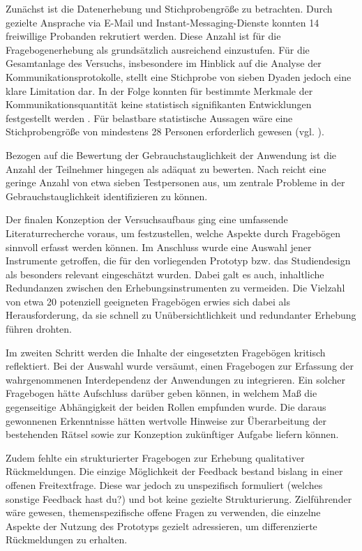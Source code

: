 Zunächst ist die Datenerhebung und Stichprobengröße zu betrachten. Durch gezielte Ansprache via E-Mail und Instant-Messaging-Dienste konnten 14 freiwillige Probanden rekrutiert werden. Diese Anzahl ist für die Fragebogenerhebung als grundsätzlich ausreichend einzustufen. Für die Gesamtanlage des Versuchs, insbesondere im Hinblick auf die Analyse der Kommunikationsprotokolle, stellt eine Stichprobe von sieben Dyaden jedoch eine klare Limitation dar. In der Folge konnten für bestimmte Merkmale der Kommunikationsquantität keine statistisch signifikanten Entwicklungen festgestellt werden . Für belastbare statistische Aussagen wäre eine Stichprobengröße von mindestens 28 Personen erforderlich gewesen (vgl. \citealp[S. 158]{cohen_power_1992}). 

Bezogen auf die Bewertung der Gebrauchstauglichkeit der Anwendung ist die Anzahl der Teilnehmer hingegen als adäquat zu bewerten. Nach  \citet[S. 3088]{turner_determining_2006} reicht eine geringe Anzahl von etwa sieben Testpersonen aus, um zentrale Probleme in der Gebrauchstauglichkeit identifizieren zu können.

Der finalen Konzeption der Versuchsaufbaus ging eine umfassende Literaturrecherche voraus, um festzustellen, welche Aspekte durch Fragebögen sinnvoll erfasst werden können. Im Anschluss wurde eine Auswahl jener Instrumente getroffen, die für den vorliegenden Prototyp bzw. das Studiendesign als besonders relevant eingeschätzt wurden. Dabei galt es auch, inhaltliche Redundanzen zwischen den Erhebungsinstrumenten zu vermeiden. Die Vielzahl von etwa 20 potenziell geeigneten Fragebögen erwies sich dabei als Herausforderung, da sie schnell zu Unübersichtlichkeit und redundanter Erhebung führen drohten. 

Im zweiten Schritt werden die Inhalte der eingesetzten Fragebögen kritisch reflektiert. Bei der Auswahl wurde versäumt, einen Fragebogen zur Erfassung der wahrgenommenen Interdependenz der Anwendungen zu integrieren. Ein solcher Fragebogen hätte Aufschluss darüber geben können, in welchem Maß die gegenseitige Abhängigkeit der beiden Rollen empfunden wurde. Die daraus gewonnenen Erkenntnisse hätten wertvolle Hinweise zur Überarbeitung der bestehenden Rätsel sowie zur Konzeption zukünftiger Aufgabe liefern können.

Zudem fehlte ein strukturierter Fragebogen zur Erhebung qualitativer Rückmeldungen. Die einzige Möglichkeit der Feedback bestand bislang in einer offenen Freitextfrage. Diese war jedoch zu unspezifisch formuliert (welches sonstige Feedback hast du?) und bot keine gezielte Strukturierung. Zielführender wäre gewesen, themenspezifische offene Fragen zu verwenden, die einzelne Aspekte der Nutzung des Prototyps gezielt adressieren, um differenzierte Rückmeldungen zu erhalten.

